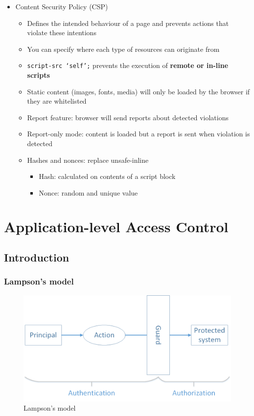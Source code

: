 \documentclass[12pt,titlepage,a4paper]{report}
\begin{document}
\begin{itemize}
		\item Content Security Policy (CSP)
		\begin{itemize}
			\item Defines the intended behaviour of a page and prevents actions that violate these intentions
			\item You can specify where each type of resources can originate from
			\item \texttt{script-src `self';} prevents the execution of \textbf{remote or in-line scripts}
			\item Static content (images, fonts, media) will only be loaded by the browser if they are whitelisted
			\item Report feature: browser will send reports about detected violations
			\item Report-only mode: content is loaded but a report is sent when violation is detected
			\item Hashes and nonces: replace unsafe-inline
			\begin{itemize}
				\item Hash: calculated on contents of a script block
				\item Nonce: random and unique value
			\end{itemize}
		\end{itemize}
	\end{itemize}
	
	
	\chapter{Application-level Access Control}
	\section{Introduction}
	\subsection{Lampson's model}
	\begin{figure}[h]
		\includegraphics[width=\linewidth]{assets/img/Lampson.png}
		\caption{Lampson's model}
	\end{figure}
	
\end{document}
